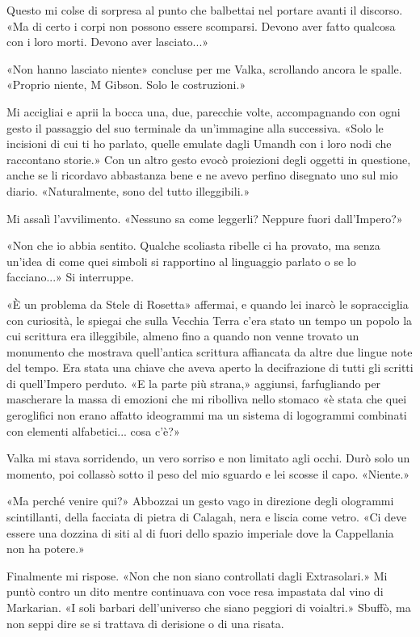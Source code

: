 Questo mi colse di sorpresa al punto che balbettai nel portare avanti il
discorso. «Ma di certo i corpi non possono essere scomparsi. Devono aver
fatto qualcosa con i loro morti. Devono aver lasciato...»

«Non hanno lasciato niente» concluse per me Valka, scrollando ancora le
spalle. «Proprio niente, M Gibson. Solo le costruzioni.»

Mi accigliai e aprii la bocca una, due, parecchie volte, accompagnando
con ogni gesto il passaggio del suo terminale da un'immagine alla
successiva. «Solo le incisioni di cui ti ho parlato, quelle emulate
dagli Umandh con i loro nodi che raccontano storie.» Con un altro gesto
evocò proiezioni degli oggetti in questione, anche se li ricordavo
abbastanza bene e ne avevo perfino disegnato uno sul mio diario.
«Naturalmente, sono del tutto illeggibili.»

Mi assalì l'avvilimento. «Nessuno sa come leggerli? Neppure fuori
dall'Impero?»

«Non che io abbia sentito. Qualche scoliasta ribelle ci ha provato, ma
senza un'idea di come quei simboli si rapportino al linguaggio parlato o
se lo facciano...» Si interruppe.

«È un problema da Stele di Rosetta» affermai, e quando lei inarcò le
sopracciglia con curiosità, le spiegai che sulla Vecchia Terra c'era
stato un tempo un popolo la cui scrittura era illeggibile, almeno fino a
quando non venne trovato un monumento che mostrava quell'antica
scrittura affiancata da altre due lingue note del tempo. Era stata una
chiave che aveva aperto la decifrazione di tutti gli scritti di
quell'Impero perduto. «E la parte più strana,» aggiunsi, farfugliando
per mascherare la massa di emozioni che mi ribolliva nello stomaco «è
stata che quei geroglifici non erano affatto ideogrammi ma un sistema di
logogrammi combinati con elementi alfabetici... cosa c'è?»

Valka mi stava sorridendo, un vero sorriso e non limitato agli occhi.
Durò solo un momento, poi collassò sotto il peso del mio sguardo e lei
scosse il capo. «Niente.»

«Ma perché venire qui?» Abbozzai un gesto vago in direzione degli
ologrammi scintillanti, della facciata di pietra di Calagah, nera e
liscia come vetro. «Ci deve essere una dozzina di siti al di fuori dello
spazio imperiale dove la Cappellania non ha potere.»

Finalmente mi rispose. «Non che non siano controllati dagli
Extrasolari.» Mi puntò contro un dito mentre continuava con voce resa
impastata dal vino di Markarian. «I soli barbari dell'universo che siano
peggiori di voialtri.» Sbuffò, ma non seppi dire se si trattava di
derisione o di una risata.


